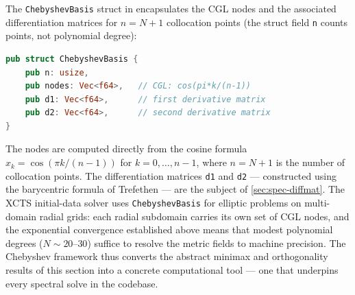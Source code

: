 The \texttt{ChebyshevBasis} struct in 
encapsulates the CGL nodes and the associated differentiation
matrices for $n = N + 1$ collocation points (the struct field
\texttt{n} counts points, not polynomial degree):
%
\begin{lstlisting}[language=Rust]
pub struct ChebyshevBasis {
    pub n: usize,
    pub nodes: Vec<f64>,   // CGL: cos(pi*k/(n-1))
    pub d1: Vec<f64>,      // first derivative matrix
    pub d2: Vec<f64>,      // second derivative matrix
}
\end{lstlisting}
%
The nodes are computed directly from the cosine formula
$x_k = \cos(\pi k / (n-1))$ for $k = 0, \ldots, n-1$, where
$n = N + 1$ is the number of collocation points.  The
differentiation matrices \texttt{d1} and \texttt{d2} --- constructed
using the barycentric formula of Trefethen \cite{Trefethen2000} ---
are the subject of \cref{sec:spec-diffmat}.  The XCTS initial-data
solver uses \texttt{ChebyshevBasis} for elliptic problems on
multi-domain radial grids: each radial subdomain carries its own
set of CGL nodes, and the exponential convergence established above
means that modest polynomial degrees ($N \sim 20$--$30$) suffice to
resolve the metric fields to machine precision.  The Chebyshev
framework thus converts the abstract minimax and orthogonality
results of this section into a concrete computational tool ---
one that underpins every spectral solve in the codebase.
